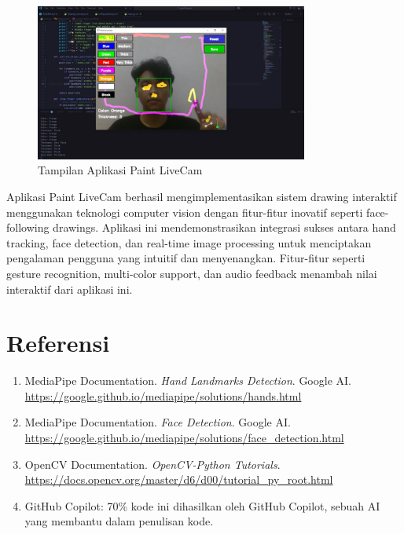 \documentclass[11pt,a4paper]{article}
\begin{document}
    \begin{figure}[h]
        \centering
        \includegraphics[width=0.8\textwidth]{Figure/ui.png}
        \caption{Tampilan Aplikasi Paint LiveCam}
        \label{fig:ui_image}
    \end{figure}
\FloatBarrier

Aplikasi Paint LiveCam berhasil mengimplementasikan sistem drawing interaktif menggunakan teknologi computer vision dengan fitur-fitur inovatif seperti face-following drawings. Aplikasi ini mendemonstrasikan integrasi sukses antara hand tracking, face detection, dan real-time image processing untuk menciptakan pengalaman pengguna yang intuitif dan menyenangkan. Fitur-fitur seperti gesture recognition, multi-color support, dan audio feedback menambah nilai interaktif dari aplikasi ini.

\section{Referensi}
\begin{enumerate}
\item MediaPipe Documentation. \textit{Hand Landmarks Detection}. Google AI. \url{https://google.github.io/mediapipe/solutions/hands.html}
\item MediaPipe Documentation. \textit{Face Detection}. Google AI. \url{https://google.github.io/mediapipe/solutions/face_detection.html}
\item OpenCV Documentation. \textit{OpenCV-Python Tutorials}. \url{https://docs.opencv.org/master/d6/d00/tutorial_py_root.html}
\item GitHub Copilot: 70\% kode ini dihasilkan oleh GitHub Copilot, sebuah AI yang membantu dalam penulisan kode.
\end{enumerate}
\end{document}
